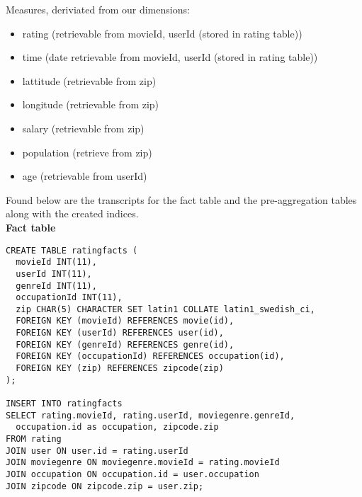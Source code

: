 \noindent Measures, deriviated from our dimensions:

\begin{itemize}
  \item rating (retrievable from movieId, userId (stored in rating table))
  \item time (date retrievable from movieId, userId (stored in rating table))
  \item lattitude (retrievable from zip)
  \item longitude (retrievable from zip)
  \item salary (retrievable from zip)
  \item population (retrieve from zip)
  \item age (retrievable from userId)
\end{itemize}

Found below are the transcripts for the fact table and the pre-aggregation tables along with the created indices. \\

\noindent\textbf{Fact table} \\
\begin{lstlisting}
CREATE TABLE ratingfacts (
  movieId INT(11),
  userId INT(11),
  genreId INT(11),
  occupationId INT(11),
  zip CHAR(5) CHARACTER SET latin1 COLLATE latin1_swedish_ci,
  FOREIGN KEY (movieId) REFERENCES movie(id),
  FOREIGN KEY (userId) REFERENCES user(id),
  FOREIGN KEY (genreId) REFERENCES genre(id),
  FOREIGN KEY (occupationId) REFERENCES occupation(id),
  FOREIGN KEY (zip) REFERENCES zipcode(zip)
);

INSERT INTO ratingfacts
SELECT rating.movieId, rating.userId, moviegenre.genreId, 
  occupation.id as occupation, zipcode.zip
FROM rating
JOIN user ON user.id = rating.userId
JOIN moviegenre ON moviegenre.movieId = rating.movieId
JOIN occupation ON occupation.id = user.occupation
JOIN zipcode ON zipcode.zip = user.zip;
\end{lstlisting}

